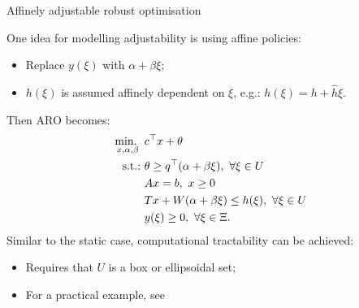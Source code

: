 \begin{frame}{Affinely adjustable robust optimisation {\small \cite{ben2004adjustable}}}

	One idea for modelling adjustability is using \alert{affine policies}:
	\vspace{-6pt}
	\begin{itemize}
		\item Replace $y(\xi)$ with $\alpha + \beta \xi$;
		\item $h(\xi)$ is assumed \alert{affinely dependent} on $\xi$, e.g.: $h(\xi)	 = h + \hat{h}\xi$.
	\end{itemize}
	
	\pause
	Then ARO becomes:
	\begin{equation*}
	\begin{aligned}
		\mini_{x, \alpha, \beta}~  & c^\top x + \theta  \\
		\text{s.t.:~}  & \theta \ge q^\top (\alpha + \beta \xi), \ \forall \xi \in U \\
			   & Ax = b, \ x \ge 0 \\
			   & Tx + W(\alpha + \beta \xi) \le h(\xi), \ \forall \xi \in U \\
			   & y(\xi) \ge 0, \ \forall \xi \in \Xi.
	\end{aligned}
	\end{equation*}
	\pause
	Similar to the static case, computational \alert{tractability} can be achieved:
		\vspace{-6pt}
		\begin{itemize}
			\item Requires that $U$ is a box or ellipsoidal set;
			\item For a practical example, see {\small \cite{ben2005retailer}}	
		\end{itemize}
   
\end{frame}


